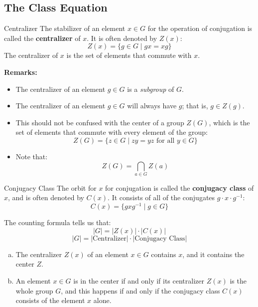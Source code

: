 \documentclass[letterpaper]{article}
\begin{document}
\subsection{The Class Equation}
\begin{definition}{Centralizer}{}
    The stabilizer of an element $x \in G$ for the operation of conjugation is called the \textbf{centralizer} of $x$. It is often denoted by $Z(x)$: 
    \[Z(x) = \{g \in G \mid gx = xg\}\]
    The centralizer of $x$ is the set of elements that commute with $x$. 
\end{definition}
\textbf{Remarks:}
\begin{itemize}
    \item The centralizer of an element $g \in G$ is a \emph{subgroup} of $G$. 
    \item The centralizer of an element $g \in G$ will always have $g$; that is, $g \in Z(g)$. 
    \item This should not be confused with the center of a group $Z(G)$, which is the set of elements that commute with every element of the group: 
    \[Z(G) = \{z \in G \mid zy = yz \text{ for all } y \in G\}\]
    \item Note that: 
    \[Z(G) = \bigcap_{a \in G} Z(a)\]
\end{itemize}

\begin{definition}{Conjugacy Class}{}
    The orbit for $x$ for conjugation is called the \textbf{conjugacy class} of $x$, and is often denoted by $C(x)$. It consists of all of the conjugates $g \cdot x \cdot g^{-1}$:
    \[C(x) = \{gxg^{-1} \mid g \in G\}\]
\end{definition}

The counting formula tells us that: 
\[|G| = |Z(x)| \cdot |C(x)|\]
\[|G| = |\text{Centralizer}| \cdot |\text{Conjugacy Class}|\]

\begin{mdframed}
    \begin{proposition}
        \begin{enumerate}[(a)]
            \item The centralizer $Z(x)$ of an element $x \in G$ contains $x$, and it contains the center $Z$. 
            \item An element $x \in G$ is in the center if and only if its centralizer $Z(x)$ is the whole group $G$, and this happens if and only if the conjugacy class $C(x)$ consists of the element $x$ alone. 
        \end{enumerate}
    \end{proposition}
\end{mdframed}
\end{document}

